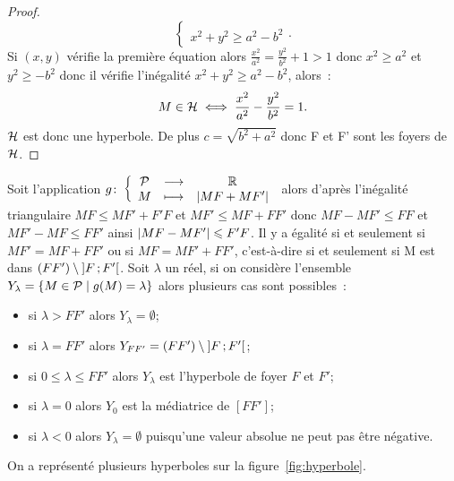\begin{proof}
\begin{equation}
\begin{cases}
    \\ x^2 + y^2 \geqslant a^2-b^2\end{cases}.
  \end{equation}
  Si \((x, y)\) vérifie la première équation alors \(\frac{x^2}{a^2}=
  \frac{y^2}{b^2} + 1>1\) donc \(x^2\geqslant a^2\) et \(y^2\geqslant -b^2\)
  donc il vérifie l'inégalité \(x^2 + y^2\geqslant a^2-b^2\), alors~:
  \begin{equation}
    M \in \mathcal{H} \iff \frac{x^2}{a^2} - \frac{y^2}{b^2} =1.
  \end{equation}
  \(\mathcal{H}\) est donc une hyperbole. De plus \(c = \sqrt{b^2 + a^2}\) donc F et F'
  sont les foyers de \(\mathcal{H}\).
\end{proof}
Soit l'application \(g\colon\left\{\begin{array}{ccc}\mathcal{P} & \longrightarrow &\mathbb{R}\\M & \longmapsto & \left\lvert MF + MF'\right\rvert\end{array}\right.\) alors d'après
l'inégalité triangulaire \(MF \leqslant MF' + F'F\) et \(MF'\leqslant MF + FF'\)
donc \(MF-MF'\leqslant FF\) et \(MF'-MF\leqslant FF'\) ainsi
\(\left\lvert MF-MF'\right\rvert\leqslant F'F\). Il y a égalité si et seulement si
\(MF' = MF + FF'\) ou si \(MF = MF' + FF'\), c'est-à-dire si et seulement si M est
dans \((FF') \setminus \left] F \, ; {} F' \right[\). Soit \(\lambda\) un réel, si on
considère l'ensemble \(Y_{\lambda} = \left\{M \in \mathcal{P}\mathrel{}\middle|\mathrel{}g(M) = \lambda\right\}\) alors
plusieurs cas sont possibles~:
\begin{itemize}
  \item si \(\lambda>FF'\) alors \(Y_{\lambda} = \emptyset\);
  \item si \(\lambda = FF'\) alors \(Y_{FF'} = (FF') \setminus
    \left] F \, ; {} F' \right[\);
  \item si \(0\leqslant\lambda\leqslant FF'\) alors \(Y_{\lambda}\) est
    l'hyperbole de foyer \(F\) et \(F'\);
  \item si \(\lambda = 0\) alors \(Y_{0}\) est la médiatrice de \([FF']\);
  \item si \(\lambda<0\) alors \(Y_{\lambda} = \emptyset\) puisqu'une valeur
    absolue ne peut pas être négative.
\end{itemize}

On a représenté plusieurs hyperboles sur la figure~\ref{fig:hyperbole}.


